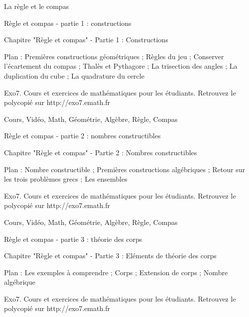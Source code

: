
   La règle et le compas




Règle et compas - partie 1 : constructions



Chapitre "Règle et compas" - Partie 1 : Constructions

Plan : Premières constructions géométriques ;
Règles du jeu ; Conserver l'écartement du compas ;
Thalès et Pythagore ; La trisection des angles ;
La duplication du cube ; La quadrature du cercle


Exo7. Cours et exercices de mathématiques pour les étudiants.
Retrouvez le polycopié sur http://exo7.emath.fr


Cours, Vidéo, Math, Géométrie, Algèbre, Règle, Compas



Règle et compas - partie 2 : nombres constructibles



Chapitre "Règle et compas" - Partie 2 : Nombres constructibles

Plan : Nombre constructible ; Premières constructions algébriques ; 
Retour sur les trois problèmes grecs ; Les ensembles

Exo7. Cours et exercices de mathématiques pour les étudiants.
Retrouvez le polycopié sur http://exo7.emath.fr


Cours, Vidéo, Math, Géométrie, Algèbre, Règle, Compas



Règle et compas - partie 3 : théorie des corps



Chapitre "Règle et compas" - Partie 3 : Eléments de théorie des corps

Plan : Les exemples à comprendre ; Corps ;
Extension de corps ; Nombre algébrique


Exo7. Cours et exercices de mathématiques pour les étudiants.
Retrouvez le polycopié sur http://exo7.emath.fr

